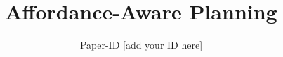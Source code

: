 \documentclass[conference]{IEEEtran}
\begin{document}
\title{Affordance-Aware Planning}

\author{Paper-ID [add your ID here]}





% 


\maketitle
\end{document}
